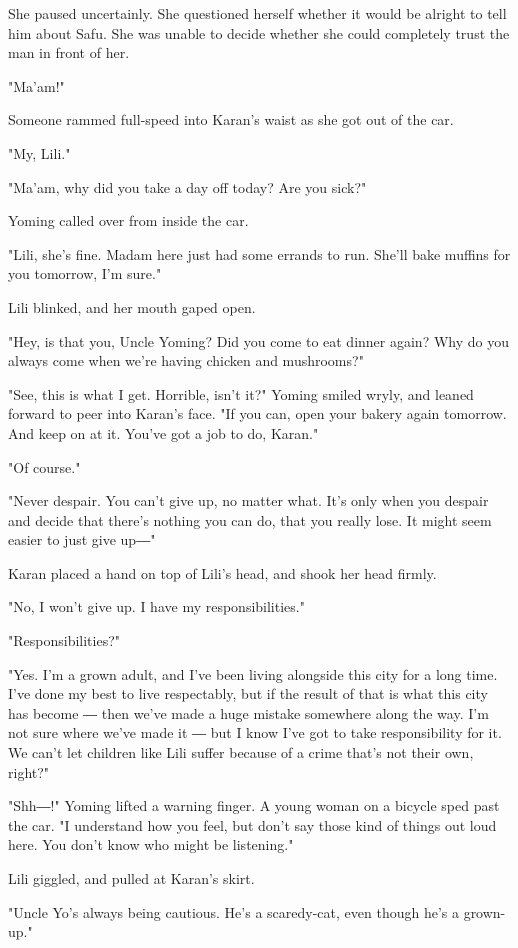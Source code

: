 She paused uncertainly. She questioned herself whether it would be
alright to tell him about Safu. She was unable to decide whether she
could completely trust the man in front of her.

"Ma'am!"

Someone rammed full-speed into Karan's waist as she got out of the car.

"My, Lili."

"Ma'am, why did you take a day off today? Are you sick?"

Yoming called over from inside the car.

"Lili, she's fine. Madam here just had some errands to run. She'll bake
muffins for you tomorrow, I'm sure."

Lili blinked, and her mouth gaped open.

"Hey, is that you, Uncle Yoming? Did you come to eat dinner again? Why
do you always come when we're having chicken and mushrooms?"

"See, this is what I get. Horrible, isn't it?" Yoming smiled wryly, and
leaned forward to peer into Karan's face. "If you can, open your bakery
again tomorrow. And keep on at it. You've got a job to do, Karan."

"Of course."

"Never despair. You can't give up, no matter what. It's only when you
despair and decide that there's nothing you can do, that you really
lose. It might seem easier to just give up―"

Karan placed a hand on top of Lili's head, and shook her head firmly.

"No, I won't give up. I have my responsibilities."

"Responsibilities?"

"Yes. I'm a grown adult, and I've been living alongside this city for a
long time. I've done my best to live respectably, but if the result of
that is what this city has become ― then we've made a huge mistake
somewhere along the way. I'm not sure where we've made it ― but I know
I've got to take responsibility for it. We can't let children like Lili
suffer because of a crime that's not their own, right?"

"Shh―!" Yoming lifted a warning finger. A young woman on a bicycle sped
past the car. "I understand how you feel, but don't say those kind of
things out loud here. You don't know who might be listening."

Lili giggled, and pulled at Karan's skirt.

"Uncle Yo's always being cautious. He's a scaredy-cat, even though he's
a grown-up."

